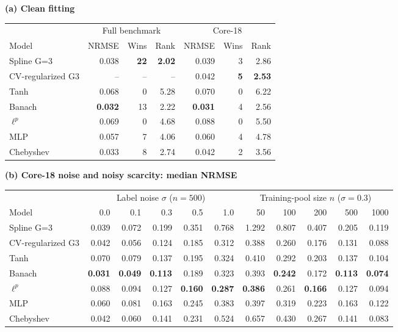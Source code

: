 \textbf{(a) Clean fitting}\par\smallskip
\begin{tabular}{lrrrrrr}
\toprule
& \multicolumn{3}{c}{Full benchmark} & \multicolumn{3}{c}{Core-18} \\
\cmidrule(lr){2-4}\cmidrule(lr){5-7}
Model & NRMSE & Wins & Rank & NRMSE & Wins & Rank \\
\midrule
Spline G=3 & 0.038 & \textbf{22} & \textbf{2.02} & 0.039 & 3 & 2.86 \\
CV-regularized G3 & -- & -- & -- & 0.042 & \textbf{5} & \textbf{2.53} \\
Tanh & 0.068 & 0 & 5.28 & 0.070 & 0 & 6.22 \\
Banach & \textbf{0.032} & 13 & 2.22 & \textbf{0.031} & 4 & 2.56 \\
$\ell^p$ & 0.069 & 0 & 4.68 & 0.088 & 0 & 5.50 \\
MLP & 0.057 & 7 & 4.06 & 0.060 & 4 & 4.78 \\
Chebyshev & 0.033 & 8 & 2.74 & 0.042 & 2 & 3.56 \\
\bottomrule
\end{tabular}
\par\medskip
\textbf{(b) Core-18 noise and noisy scarcity: median NRMSE}\par\smallskip
\begin{tabular}{lrrrrrrrrrr}
\toprule
& \multicolumn{5}{c}{Label noise $\sigma$ ($n=500$)} & \multicolumn{5}{c}{Training-pool size $n$ ($\sigma=0.3$)} \\
\cmidrule(lr){2-6}\cmidrule(lr){7-11}
Model & 0.0 & 0.1 & 0.3 & 0.5 & 1.0 & 50 & 100 & 200 & 500 & 1000 \\
\midrule
Spline G=3 & 0.039 & 0.072 & 0.199 & 0.351 & 0.768 & 1.292 & 0.807 & 0.407 & 0.205 & 0.119 \\
CV-regularized G3 & 0.042 & 0.056 & 0.124 & 0.185 & 0.312 & 0.388 & 0.260 & 0.176 & 0.131 & 0.088 \\
Tanh & 0.070 & 0.079 & 0.137 & 0.195 & 0.324 & 0.410 & 0.292 & 0.203 & 0.137 & 0.104 \\
Banach & \textbf{0.031} & \textbf{0.049} & \textbf{0.113} & 0.189 & 0.323 & 0.393 & \textbf{0.242} & 0.172 & \textbf{0.113} & \textbf{0.074} \\
$\ell^p$ & 0.088 & 0.094 & 0.127 & \textbf{0.160} & \textbf{0.287} & \textbf{0.386} & 0.261 & \textbf{0.166} & 0.127 & 0.094 \\
MLP & 0.060 & 0.081 & 0.163 & 0.245 & 0.383 & 0.397 & 0.319 & 0.223 & 0.163 & 0.122 \\
Chebyshev & 0.042 & 0.060 & 0.141 & 0.231 & 0.524 & 0.657 & 0.430 & 0.267 & 0.141 & 0.083 \\
\bottomrule
\end{tabular}
